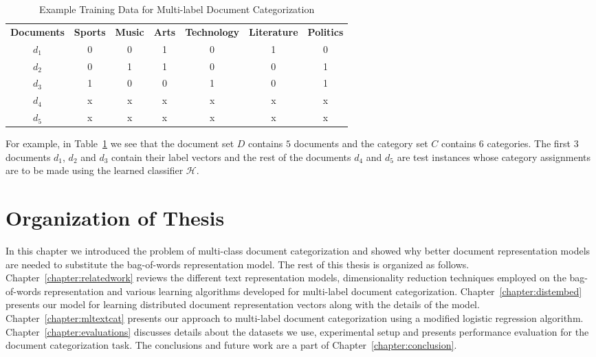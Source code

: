 \begin{table}[h!]
\tabcolsep=0.1cm
\footnotesize
\begin{center}
\begin{tabular}{c@{\hskip5mm} c c c c c c}
\toprule
\textbf{Documents}	&	\textbf{Sports} & \textbf{Music} & \textbf{Arts} & \textbf{Technology}  & \textbf{Literature} & \textbf{Politics}\\
\cmidrule{1-1}
\cmidrule{2-7}
$d_{1}$ & 0 & 0 & 1 & 0 & 1 & 0\\
$d_{2}$ & 0 & 1 & 1 & 0 & 0 & 1\\
$d_{3}$ & 1 & 0 & 0 & 1 & 0 & 1\\
$d_{4}$ & x & x & x & x & x & x\\
$d_{5}$ & x & x & x & x & x & x\\
\bottomrule         
\end{tabular}
\caption{\label{traindata:example:table}{Example Training Data for Multi-label Document Categorization}}
\end{center}
\end{table}

For example, in Table~\ref{traindata:example:table} we see that the document set $D$ contains $5$ documents and the category set $C$ contains $6$ categories. The first $3$ documents $d_{1}$, $d_{2}$ and $d_{3}$ contain their label vectors and the rest of the documents $d_{4}$ and $d_{5}$ are test instances whose category assignments are to be made using the learned classifier $\mathcal{H}$.

\section{Organization of Thesis}
In this chapter we introduced the problem of multi-class document categorization and showed why better document representation models are needed to substitute the bag-of-words representation model. The rest of this thesis is organized as follows. Chapter~\ref{chapter:relatedwork} reviews the different text representation models, dimensionality reduction techniques employed on the bag-of-words representation and various learning algorithms developed for multi-label document categorization. Chapter~\ref{chapter:distembed} presents our model for learning distributed document representation vectors along with the details of the model. Chapter~\ref{chapter:mltextcat} presents our approach to multi-label document categorization using a modified logistic regression algorithm. Chapter~\ref{chapter:evaluations} discusses details about the datasets we use, experimental setup and presents performance evaluation for the document categorization task. The conclusions and future work are a part of Chapter~\ref{chapter:conclusion}.






